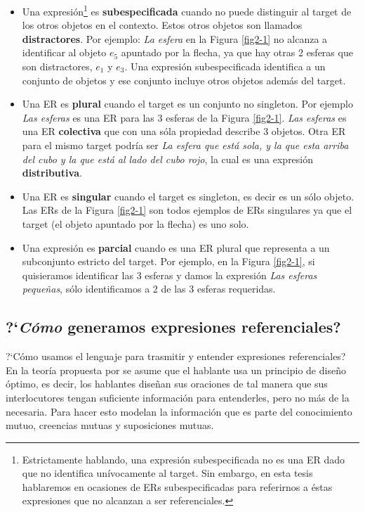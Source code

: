 \begin{itemize}
\item Una expresi\'on\footnote{Estrictamente hablando, una expresi\'on subespecificada no es una ER dado que no identifica un\'ivocamente al target. Sin embargo, en esta tesis hablaremos en ocasiones de ERs subespecificadas para referirnos a \'estas expresiones que no alcanzan a ser referenciales.} es {\bf subespecificada} cuando no puede distinguir al target de los otros objetos en el contexto. Estos otros objetos son llamados \textbf{distractores}. Por ejemplo: {\it La esfera} en la Figura \ref{fig2-1} no alcanza a identificar al objeto $e_5$ apuntado por la flecha, ya que hay otras 2 esferas que son distractores, $e_1$ y $e_3$. Una expresi\'on subespecificada identifica a un conjunto de objetos y ese conjunto incluye otros objetos adem\'as del target.

\item Una ER es {\bf plural} cuando el target es un conjunto no singleton. Por ejemplo {\it Las esferas} es una ER para las 3 esferas de la Figura \ref{fig2-1}. {\it Las esferas} es una ER \textbf{colectiva} que con una s\'ola propiedad describe 3 objetos. Otra ER para el mismo target podr\'ia ser {\it La esfera que est\'a sola, y la que esta arriba del cubo y la que est\'a al lado del cubo rojo}, la cual es una expresi\'on \textbf{distributiva}.

\item Una ER es {\bf singular} cuando el target es singleton, es decir es un s\'olo objeto. Las ERs de la Figura \ref{fig2-1} son todos ejemplos de ERs singulares ya que el target (el objeto apuntado por la flecha) es uno solo. 

\item Una expresi\'on es {\bf parcial} cuando es una ER plural que representa a un subconjunto estricto del target. Por ejemplo, en la Figura \ref{fig2-1}, si quisieramos identificar las 3 esferas y damos la expresi\'on {\it Las esferas peque\~nas}, s\'olo identificamos a 2 de las 3 esferas requeridas.
\end{itemize}

\subsection{?`\emph{C\'omo} generamos expresiones referenciales?}
\label{sec:psicolinguistica}

?`C\'omo usamos el lenguaje para trasmitir y entender expresiones referenciales? En la teor\'ia propuesta por \cite{clark1992arenas,clark96} se asume que el hablante usa un principio de dise\~no \'optimo, es decir, los hablantes dise\~nan sus oraciones de tal manera que sus interlocutores tengan suficiente informaci\'on para entenderles, pero no m\'as de la necesaria. Para hacer esto modelan la informaci\'on que es parte del conocimiento mutuo, creencias mutuas y suposiciones mutuas. 

